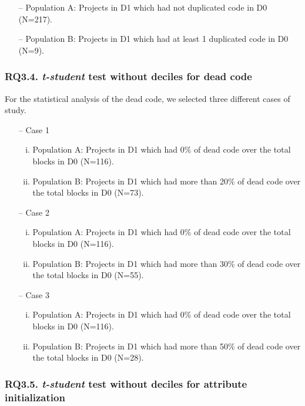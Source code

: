 \begin{itemize}
    \item[--] Population A: Projects in D1 which had not duplicated code in D0 (N=217).
    \item[--] Population B: Projects in D1 which had at least 1 duplicated code in D0 (N=9).
\end{itemize}


\subsubsection{RQ3.4. \textit{t-student} test without deciles for dead code}
\label{subsubsec:RQ3_4_statistical}

For the statistical analysis of the dead code, we selected three different cases of study.

\begin{itemize}
    \item[--] Case 1
    \begin{enumerate}[(i)]
        \item Population A: Projects in D1 which had 0\% of dead code over the total blocks in D0 (N=116).
        \item Population B: Projects in D1 which had more than 20\% of dead code over the total blocks in D0 (N=73).
    \end{enumerate}
    \item[--] Case 2
    \begin{enumerate}[(i)]
        \item Population A: Projects in D1 which had 0\% of dead code over the total blocks in D0 (N=116).
        \item Population B: Projects in D1 which had more than 30\% of dead code over the total blocks in D0 (N=55).
    \end{enumerate}
    \item[--] Case 3
    \begin{enumerate}[(i)]
        \item Population A: Projects in D1 which had 0\% of dead code over the total blocks in D0 (N=116).
        \item Population B: Projects in D1 which had more than 50\% of dead code over the total blocks in D0 (N=28).
    \end{enumerate}
\end{itemize}


\subsubsection{RQ3.5. \textit{t-student} test without deciles for attribute initialization}
\label{subsubsec:RQ3_5_statistical}

